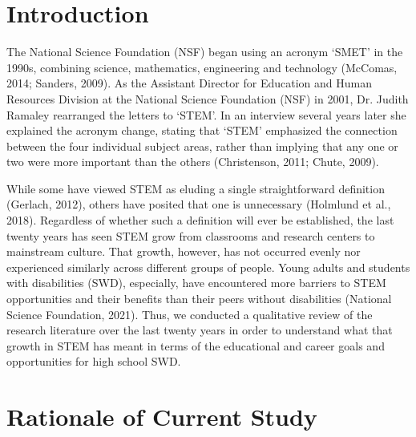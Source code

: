 \documentclass[11pt]{sig-alternate}
\begin{document}
\pagebreak
\pagebreak

\vspace{5mm}
\section*{\vspace{140mm}}
\section*{Introduction}
\begin{large}

The National Science Foundation (NSF) began using an acronym ‘SMET’ in the 1990s, combining science, mathematics, engineering and technology (McComas, 2014; Sanders, 2009). As the Assistant Director for Education and Human Resources Division at the National Science Foundation (NSF) in 2001, Dr. Judith Ramaley rearranged the letters to ‘STEM’. In an interview several years later she explained the acronym change, stating that ‘STEM’ emphasized the connection between the four individual subject areas, rather than implying that any one or two were more important than the others (Christenson, 2011; Chute, 2009).

While some have viewed STEM as eluding a single straightforward definition (Gerlach, 2012), others have posited that one is unnecessary (Holmlund et al., 2018). Regardless of whether such a definition will ever be established, the last twenty years has seen STEM grow from classrooms and research centers to mainstream culture. That growth, however, has not occurred evenly nor experienced similarly across different groups of people. Young adults and students with disabilities (SWD), especially, have encountered more barriers to STEM opportunities and their benefits than their peers without disabilities (National Science Foundation, 2021). Thus, we conducted a qualitative review of the research literature over the last twenty years in order to understand what that growth in STEM has meant in terms of the educational and career goals and opportunities for high school SWD.
 

\section*{Rationale of Current Study}


\end{large}
\end{document}
